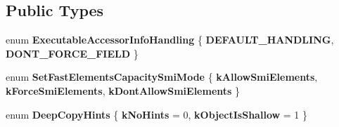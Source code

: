 \subsection*{Public Types}
\begin{DoxyCompactItemize}
\item 
\hypertarget{classv8_1_1internal_1_1_j_s_object_a841337b35d9bff0cf9b49b2ab68c3889}{}enum {\bfseries Executable\+Accessor\+Info\+Handling} \{ {\bfseries D\+E\+F\+A\+U\+L\+T\+\_\+\+H\+A\+N\+D\+L\+I\+N\+G}, 
{\bfseries D\+O\+N\+T\+\_\+\+F\+O\+R\+C\+E\+\_\+\+F\+I\+E\+L\+D}
 \}\label{classv8_1_1internal_1_1_j_s_object_a841337b35d9bff0cf9b49b2ab68c3889}

\item 
\hypertarget{classv8_1_1internal_1_1_j_s_object_abd9510eeaafbcfacab1aa36a80b88e4b}{}enum {\bfseries Set\+Fast\+Elements\+Capacity\+Smi\+Mode} \{ {\bfseries k\+Allow\+Smi\+Elements}, 
{\bfseries k\+Force\+Smi\+Elements}, 
{\bfseries k\+Dont\+Allow\+Smi\+Elements}
 \}\label{classv8_1_1internal_1_1_j_s_object_abd9510eeaafbcfacab1aa36a80b88e4b}

\item 
\hypertarget{classv8_1_1internal_1_1_j_s_object_a88ba397dab898281cbd363286a67f27f}{}enum {\bfseries Deep\+Copy\+Hints} \{ {\bfseries k\+No\+Hints} = 0, 
{\bfseries k\+Object\+Is\+Shallow} = 1
 \}\label{classv8_1_1internal_1_1_j_s_object_a88ba397dab898281cbd363286a67f27f}

\end{DoxyCompactItemize}
